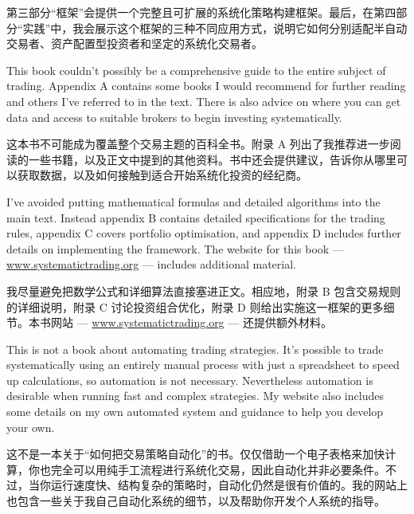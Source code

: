\begin{chineseblock}第三部分“框架”会提供一个完整且可扩展的系统化策略构建框架。最后，在第四部分“实践”中，我会展示这个框架的三种不同应用方式，说明它如何分别适配半自动交易者、资产配置型投资者和坚定的系统化交易者。\end{chineseblock}

\bipairgap

\begin{englishblock} This book couldn't possibly be a comprehensive guide to the entire subject of trading. Appendix A contains some books I would recommend for further reading and others I've referred to in the text. There is also advice on where you can get data and access to suitable brokers to begin investing systematically. \end{englishblock}

\begin{chineseblock}这本书不可能成为覆盖整个交易主题的百科全书。附录 A 列出了我推荐进一步阅读的一些书籍，以及正文中提到的其他资料。书中还会提供建议，告诉你从哪里可以获取数据，以及如何接触到适合开始系统化投资的经纪商。\end{chineseblock}

\bipairgap

\begin{englishblock} I've avoided putting mathematical formulas and detailed algorithms into the main text. Instead appendix B contains detailed specifications for the trading rules, appendix C covers portfolio optimisation, and appendix D includes further details on implementing the framework. The website for this book --- \url{www.systematictrading.org} --- includes additional material. \end{englishblock}

\begin{chineseblock}我尽量避免把数学公式和详细算法直接塞进正文。相应地，附录 B 包含交易规则的详细说明，附录 C 讨论投资组合优化，附录 D 则给出实施这一框架的更多细节。本书网站 --- \url{www.systematictrading.org} --- 还提供额外材料。\end{chineseblock}

\bipairgap

\begin{englishblock} This is not a book about automating trading strategies. It's possible to trade systematically using an entirely manual process with just a spreadsheet to speed up calculations, so automation is not necessary. Nevertheless automation is desirable when running fast and complex strategies. My website also includes some details on my own automated system and guidance to help you develop your own. \end{englishblock}

\begin{chineseblock}这不是一本关于“如何把交易策略自动化”的书。仅仅借助一个电子表格来加快计算，你也完全可以用纯手工流程进行系统化交易，因此自动化并非必要条件。不过，当你运行速度快、结构复杂的策略时，自动化仍然是很有价值的。我的网站上也包含一些关于我自己自动化系统的细节，以及帮助你开发个人系统的指导。\end{chineseblock}
